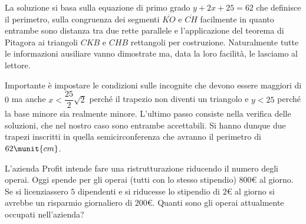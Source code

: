 La soluzione si basa sulla equazione di primo grado 
\(y+2x+25=62\) 
che definisce il perimetro, sulla congruenza dei segmenti 
\(\overline{{KO}}\) 
e 
\(\overline{{CH}}\) 
facilmente in quanto entrambe sono distanza tra due 
rette parallele e l'applicazione del teorema di Pitagora ai triangoli 
\({CKB}\) e \({CHB}\) 
rettangoli per costruzione. Naturalmente tutte le informazioni ausiliare 
vanno dimostrate ma, data la loro facilità, le lasciamo al lettore.

Importante è impostare le condizioni sulle incognite che devono essere 
maggiori di \(0\) ma anche \(x<\dfrac{25}{2}\sqrt{2}\) perché il 
trapezio non diventi un triangolo e \(y<25\) perché la base minore sia 
realmente minore. 
L'ultimo passo consiste nella verifica delle soluzioni, che nel nostro 
caso sono entrambe accettabili. 
Si hanno dunque due trapezi inscritti in quella semicirconferenza 
che avranno il perimetro di \(62\munit{cm}\).

\begin{problema}{}{}
L'azienda Profit intende fare una ristrutturazione riducendo il numero 
degli operai. 
Oggi spende per gli operai (tutti con lo stesso stipendio) \(800€\) al 
giorno. 
Se si licenziassero \(5\) dipendenti e si riducesse lo stipendio di 
\(2€\) al giorno si avrebbe un risparmio giornaliero di \(200€\). 
Quanti sono gli operai attualmente occupati nell'azienda?
\end{problema}


